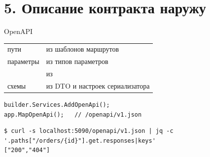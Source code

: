 \documentclass[aspectratio=169,10pt,t]{beamer}
\newcommand{\codesm}{\ttfamily\fontsize{7.6}{9.0}\selectfont}
\newcommand{\termsm}{\ttfamily\fontsize{6.6}{7.9}\selectfont}
\begin{document}
\begin{frame}[plain]
\end{frame}

\section{5. Описание контракта наружу}

\begin{frame}[plain]
\end{frame}

\begin{frame}[fragile]{OpenAPI}
  \slidetop
  {\renewcommand{\arraystretch}{1.25}\small
  \begin{tabular}{@{}L{4.0cm}L{8.8cm}@{}}
    пути                & из шаблонов маршрутов \\
    параметры           & из типов параметров \\
             & из  \\
    схемы               & из DTO и настроек сериализатора \\
  \end{tabular}}

  \slidegap
\begin{lstlisting}[style=csharp,basicstyle=\codesm]
builder.Services.AddOpenApi();
app.MapOpenApi();   // /openapi/v1.json
\end{lstlisting}

\begin{lstlisting}[style=term,basicstyle=\termsm]
$ curl -s localhost:5090/openapi/v1.json | jq -c '.paths["/orders/{id}"].get.responses|keys'
["200","404"]
\end{lstlisting}

\end{frame}

\begin{frame}[plain]
\end{frame}
\end{document}
